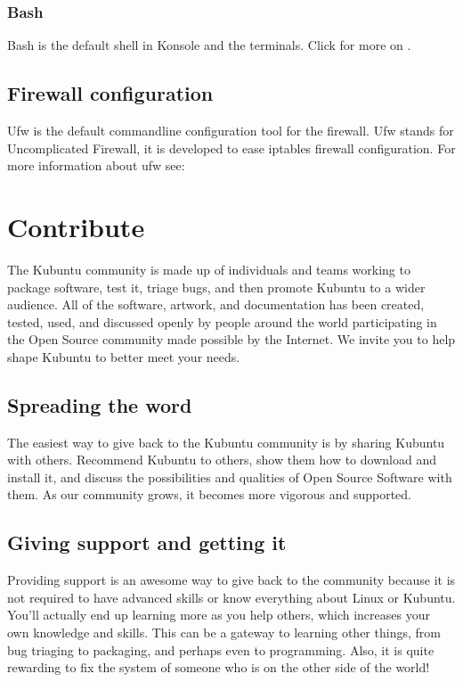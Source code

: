 \documentclass[letterpaper,10pt,english]{sphinxmanual}
\begin{document}
\subsection{Bash}
\label{\detokenize{docs/software:bash}}
Bash is the default shell in Konsole and the terminals. Click for more on .


\section{Firewall configuration}
\label{\detokenize{docs/software:firewall-configuration}}
Ufw is the default commandline configuration tool for the firewall. Ufw stands for Uncomplicated Firewall, it is developed to ease iptables firewall configuration. For more information about ufw see: 


\chapter{Contribute}
\label{\detokenize{docs/contribute::doc}}\label{\detokenize{docs/contribute:contribute}}\label{\detokenize{docs/contribute:contribute-link}}
The Kubuntu community is made up of individuals and teams working to package software, test it, triage bugs, and then promote Kubuntu to a wider audience. All of the software, artwork, and documentation has been created, tested, used, and discussed openly by people around the world participating in the Open Source community made possible by the Internet. We invite you to help shape Kubuntu to better meet your needs.


\section{Spreading the word}
\label{\detokenize{docs/contribute:spreading-the-word}}
The easiest way to give back to the Kubuntu community is by sharing Kubuntu with others. Recommend Kubuntu to others, show them how to download and install it, and discuss the possibilities and qualities of Open Source Software with them. As our community grows, it becomes more vigorous and supported.


\section{Giving support and getting it}
\label{\detokenize{docs/contribute:giving-support-and-getting-it}}
Providing support is an awesome way to give back to the community because it is not required to have advanced skills or know everything about Linux or Kubuntu. You'll actually end up learning more as you help others, which increases your own knowledge and skills. This can be a gateway to learning other things, from bug triaging to packaging, and perhaps even to programming. Also, it is quite rewarding to fix the system of someone who is on the other side of the world!
\end{document}
